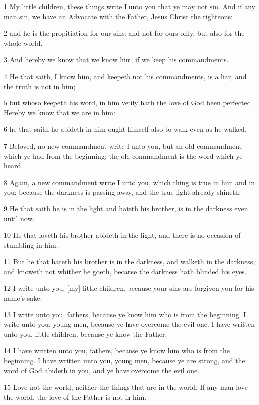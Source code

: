\par 1 My little children, these things write I unto you that ye may not sin. And if any man sin, we have an Advocate with the Father, Jesus Christ the righteous:
\par 2 and he is the propitiation for our sins; and not for ours only, but also for the whole world.
\par 3 And hereby we know that we know him, if we keep his commandments.
\par 4 He that saith, I know him, and keepeth not his commandments, is a liar, and the truth is not in him;
\par 5 but whoso keepeth his word, in him verily hath the love of God been perfected. Hereby we know that we are in him:
\par 6 he that saith he abideth in him ought himself also to walk even as he walked.
\par 7 Beloved, no new commandment write I unto you, but an old commandment which ye had from the beginning: the old commandment is the word which ye heard.
\par 8 Again, a new commandment write I unto you, which thing is true in him and in you; because the darkness is passing away, and the true light already shineth.
\par 9 He that saith he is in the light and hateth his brother, is in the darkness even until now.
\par 10 He that loveth his brother abideth in the light, and there is no occasion of stumbling in him.
\par 11 But he that hateth his brother is in the darkness, and walketh in the darkness, and knoweth not whither he goeth, because the darkness hath blinded his eyes.
\par 12 I write unto you, [my] little children, because your sins are forgiven you for his name's sake.
\par 13 I write unto you, fathers, because ye know him who is from the beginning. I write unto you, young men, because ye have overcome the evil one. I have written unto you, little children, because ye know the Father.
\par 14 I have written unto you, fathers, because ye know him who is from the beginning. I have written unto you, young men, because ye are strong, and the word of God abideth in you, and ye have overcome the evil one.
\par 15 Love not the world, neither the things that are in the world. If any man love the world, the love of the Father is not in him.
